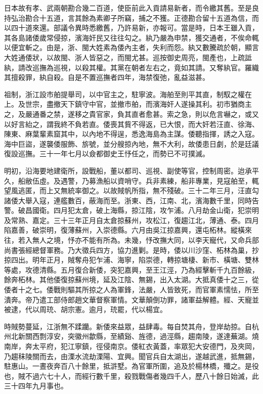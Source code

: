 \begin{pinyinscope}
日本故有孝、武兩朝勘合幾二百道，使臣前此入貢請易新者，而令繳其舊。至是良持弘治勘合十五道，言其餘為素卿子所竊，捕之不獲。正德勘合留十五道為信，而以四十道來還。部議令異時悉繳舊，乃許易新，亦報可。當是時，日本王雖入貢，其各島諸倭歲常侵掠，濱海奸民又往往勾之。紈乃嚴為申禁，獲交通者，不俟命輒以便宜斬之。由是，浙、閩大姓素為倭內主者，失利而怨。紈又數騰疏於朝，顯言大姓通倭狀，以故閩、浙人皆惡之，而閩尤甚。巡按御史周亮，閩產也，上疏詆紈，請改巡撫為巡視，以殺其權。其黨在朝者左右之，竟如其請。又奪紈官。羅織其擅殺罪，紈自殺。自是不置巡撫者四年，海禁復弛，亂益滋甚。

祖制，浙江設市舶提舉司，以中官主之，駐寧波。海舶至則平其直，制馭之權在上。及世宗，盡撤天下鎮守中官，並撤市舶，而濱海奸人遂操其利。初市猶商主之，及嚴通番之禁，遂移之貴官家，負其直者愈甚。索之急，則以危言嚇之，或又以好言紿之，謂我終不負若直。倭喪其貲不得返，已大恨，而大奸若汪直、徐海、陳東、麻葉輩素窟其中，以內地不得逞，悉逸海島為主謀。倭聽指揮，誘之入寇。海中巨盜，遂襲倭服飾、旂號，並分艘掠內地，無不大利，故倭患日劇，於是廷議復設巡撫。三十一年七月以僉都御史王忬任之，而勢已不可撲滅。

明初，沿海要地建衛所，設戰船，董以都司、巡視、副使等官，控制周密。迨承平久，船敝伍虛。及遇警，乃募漁船以資哨守。兵非素練，船非專業，見寇舶至，輒望風逃匿，而上又無統率御之。以故賊帆所指，無不殘破。三十二年三月，汪直勾諸倭大舉入寇，連艦數百，蔽海而至。浙東、西，江南、北，濱海數千里，同時告警。破昌國衛。四月犯太倉，破上海縣，掠江陰，攻乍浦。八月劫金山衛，犯崇明及常熟、嘉定。三十三年正月自太倉掠蘇州，攻松江，復趨江北，薄通、泰。四月陷嘉善，破崇明，復薄蘇州，入崇德縣。六月由吳江掠嘉興，還屯柘林。縱橫來往，若入無人之境，忬亦不能有所為。未幾，忬改撫大同，以李天寵代，又命兵部尚書張經總督軍務。乃大徵兵四方，協力進剿。是時，倭以川沙窪、柘林為巢，抄掠四出。明年正月，賊奪舟犯乍浦、海寧，陷崇德，轉掠塘棲、新市、橫塘、雙林等處，攻德清縣。五月復合新倭，突犯嘉興，至王江涇，乃為經擊斬千九百餘級，餘奔柘林。其他倭復掠蘇州境，延及江陰、無錫，出入太湖。大抵真倭十之三，從倭者十之七。倭戰則驅其所掠之人為軍鋒，法嚴，人皆致死，而官軍素懦怯，所至潰奔。帝乃遣工部侍郎趙文華督察軍情。文華顛倒功罪，諸軍益解體。經、天寵並被逮，代以周珫、胡宗憲。逾月，珫罷，代以楊宜。

時賊勢蔓延，江浙無不蹂躪。新倭來益眾，益肆毒。每自焚其舟，登岸劫掠。自杭州北新關西剽淳安，突徽州歙縣，至績谿、旌德，過涇縣，趨南陵，遂達蕪湖。燒南岸，奔太平府，犯江寧鎮，徑侵南京。倭紅衣黃蓋，率眾犯大安德門，及夾岡，乃趨秣陵關而去，由溧水流劫溧陽、宜興。聞官兵自太湖出，遂越武進，抵無錫，駐惠山。一晝夜奔百八十餘里，抵滸墅。為官軍所圍，追及於楊林橋，殲之。是役也，賊不過六七十人，而經行數千里，殺戮戰傷者幾四千人，歷八十餘日始滅，此三十四年九月事也。


\end{pinyinscope}
